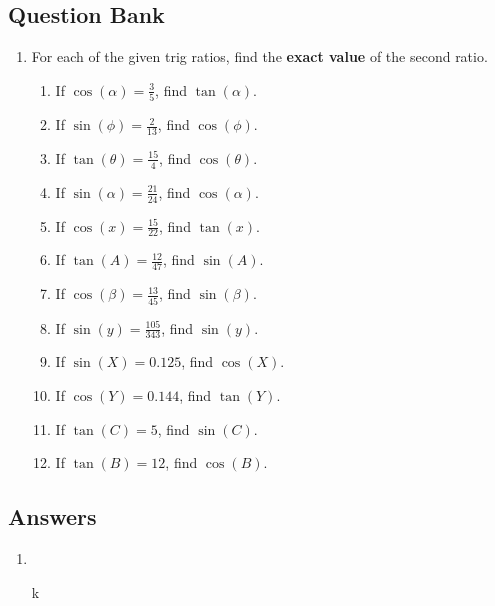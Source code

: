 \documentclass[a4paper,12pt]{article}
\begin{document}
\newpage
\subsection*{Question Bank}

\begin{enumerate}
\item For each of the given trig ratios, find the \textbf{exact 
value} of the second ratio.
    \begin{enumerate}
    \item If $\cos(\alpha) = \frac{3}{5}$, find $\tan(\alpha)$.
    \item If $\sin(\phi) = \frac{2}{13}$, find $\cos(\phi)$.
    \item If $\tan(\theta) = \frac{15}{4}$, find $\cos(\theta)$.
    \item If $\sin(\alpha) = \frac{21}{24}$, find $\cos(\alpha)$.
    \item If $\cos(x) = \frac{15}{22}$, find $\tan(x)$.
    \item If $\tan(A) = \frac{12}{47}$, find $\sin(A)$.
    \item If $\cos(\beta) = \frac{13}{45}$, find $\sin(\beta)$.
    \item If $\sin(y) = \frac{105}{343}$, find $\sin(y)$.

    \item If $\sin(X) = 0.125$, find $\cos(X)$.
    \item If $\cos(Y) = 0.144$, find $\tan(Y)$.
    \item If $\tan(C) = 5$, find $\sin(C)$.
    \item If $\tan(B) = 12$, find $\cos(B)$.
    \end{enumerate}
\end{enumerate}

\newpage
\subsection*{Answers}

\begin{enumerate}
\item 
    \begin{enumerate}
    \end{enumerate}k
\end{enumerate}
\end{document}
